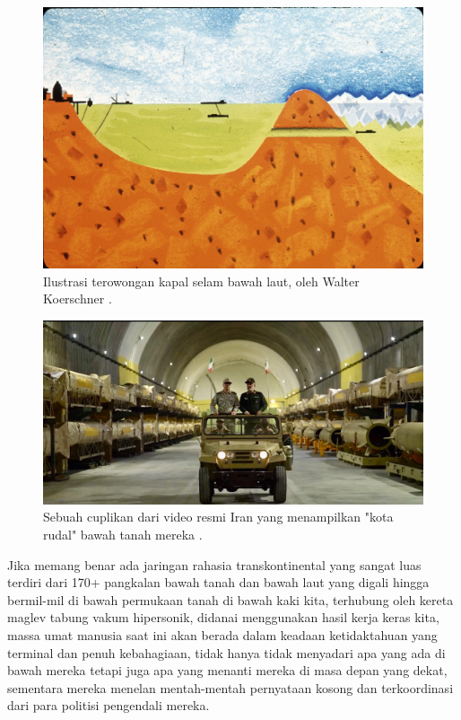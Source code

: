 \documentclass[10pt,twocolumn,letterpaper]{article}
\begin{document}
\begin{figure}[t]
\begin{center}
   \includegraphics[width=1\linewidth]{sub.jpg}
\end{center}
   \caption{Ilustrasi terowongan kapal selam bawah laut, oleh Walter Koerschner \cite{22,23}.}
\label{fig:6}
\label{fig:onecol}

\end{figure}

\begin{figure}[t]
\begin{center}
   \includegraphics[width=1\linewidth]{iran.jpeg}
\end{center}
   \caption{Sebuah cuplikan dari video resmi Iran yang menampilkan "kota rudal" bawah tanah mereka \cite{39,40}.}
\label{fig:12}
\label{fig:onecol}
\end{figure}

Jika memang benar ada jaringan rahasia transkontinental yang sangat luas terdiri dari 170+ pangkalan bawah tanah dan bawah laut yang digali hingga bermil-mil di bawah permukaan tanah di bawah kaki kita, terhubung oleh kereta maglev tabung vakum hipersonik, didanai menggunakan hasil kerja keras kita, massa umat manusia saat ini akan berada dalam keadaan ketidaktahuan yang terminal dan penuh kebahagiaan, tidak hanya tidak menyadari apa yang ada di bawah mereka tetapi juga apa yang menanti mereka di masa depan yang dekat, sementara mereka menelan mentah-mentah pernyataan kosong dan terkoordinasi dari para politisi pengendali mereka.
\end{document}
